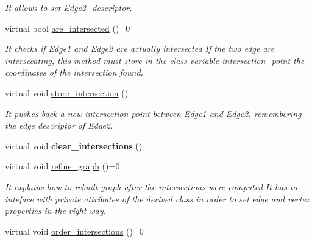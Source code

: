 \begin{DoxyCompactItemize}
\begin{DoxyCompactList}\small\item\em It allows to set Edge2\_\-descriptor. \item\end{DoxyCompactList}\item 
\hypertarget{classintersector__base__class_a228d28f80f13bf02b88f02a8d015c6a0}{
virtual bool \hyperlink{classintersector__base__class_a228d28f80f13bf02b88f02a8d015c6a0}{are\_\-intersected} ()=0}
\label{classintersector__base__class_a228d28f80f13bf02b88f02a8d015c6a0}

\begin{DoxyCompactList}\small\item\em It checks if Edge1 and Edge2 are actually intersected  If the two edge are intersecating, this method must store in the class variable intersection\_\-point the coordinates of the intersection found. \item\end{DoxyCompactList}\item 
\hypertarget{classintersector__base__class_aac491cba39ea4dc1abe943a007b62de9}{
virtual void \hyperlink{classintersector__base__class_aac491cba39ea4dc1abe943a007b62de9}{store\_\-intersection} ()}
\label{classintersector__base__class_aac491cba39ea4dc1abe943a007b62de9}

\begin{DoxyCompactList}\small\item\em It pushes back a new intersection point between Edge1 and Edge2, remembering the edge descriptor of Edge2. \item\end{DoxyCompactList}\item 
\hypertarget{classintersector__base__class_a4ea6e2420f0a43f8f5066371e2efc1a5}{
virtual void {\bfseries clear\_\-intersections} ()}
\label{classintersector__base__class_a4ea6e2420f0a43f8f5066371e2efc1a5}

\item 
\hypertarget{classintersector__base__class_a50ea9691038f34ac8dae9f80af5e8fb6}{
virtual void \hyperlink{classintersector__base__class_a50ea9691038f34ac8dae9f80af5e8fb6}{refine\_\-graph} ()=0}
\label{classintersector__base__class_a50ea9691038f34ac8dae9f80af5e8fb6}

\begin{DoxyCompactList}\small\item\em It explains how to rebuilt graph after the intersections were computed  It has to inteface with private attributes of the derived class in order to set edge and vertex properties in the right way. \item\end{DoxyCompactList}\item 
\hypertarget{classintersector__base__class_ac7266d33ff6840e07837ed3247ef3de7}{
virtual void \hyperlink{classintersector__base__class_ac7266d33ff6840e07837ed3247ef3de7}{order\_\-intersections} ()=0}
\label{classintersector__base__class_ac7266d33ff6840e07837ed3247ef3de7}


\end{DoxyCompactItemize}
